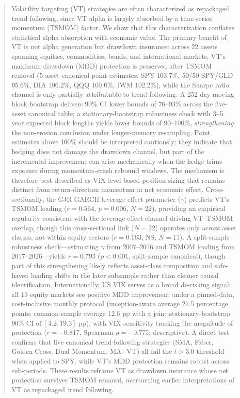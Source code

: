 
\begin{abstract}
\noindent
Volatility targeting (VT) strategies are often characterized as repackaged trend following, since VT alpha is largely absorbed by a time-series momentum (TSMOM) factor. We show that this characterization conflates statistical alpha absorption with economic value. The primary benefit of VT is not alpha generation but drawdown insurance: across 22 assets spanning equities, commodities, bonds, and international markets, VT's maximum drawdown (MDD) protection is preserved after TSMOM removal (5-asset canonical point estimates: SPY 103.7\%, 50/50 SPY/GLD 95.6\%, DIA 106.2\%, QQQ 109.0\%, IWM 102.2\%), while the Sharpe ratio channel is only partially attributable to trend following. A 252-day moving-block bootstrap delivers 90\% CI lower bounds of 76--93\% across the five-asset canonical table; a stationary-bootstrap robustness check with 3--5 year expected block lengths yields lower bounds of 90--100\%, \emph{strengthening} the non-erosion conclusion under longer-memory resampling. Point estimates above 100\% should be interpreted cautiously: they indicate that hedging does not damage the drawdown channel, but part of the incremental improvement can arise mechanically when the hedge trims exposure during momentum-crash rebound windows. The mechanism is therefore best described as VIX-level-based position sizing that remains distinct from return-direction momentum in net economic effect. Cross-sectionally, the GJR-GARCH leverage effect parameter ($\gamma$) predicts VT's TSMOM loading ($r = 0.564$, $p = 0.006$, $N = 22$), providing an empirical regularity consistent with the leverage effect channel driving VT--TSMOM overlap, though this cross-sectional link ($N = 22$) operates only across asset classes, not within equity sectors ($r = 0.163$, NS, $N = 11$). A split-sample robustness check---estimating $\gamma$ from 2007--2016 and TSMOM loading from 2017--2026---yields $r = 0.793$ ($p < 0.001$, split-sample canonical), though part of this strengthening likely reflects asset-class composition and safe-haven loading shifts in the later subsample rather than cleaner causal identification. Internationally, US VIX serves as a broad de-risking signal: all 13 equity markets see positive MDD improvement under a pinned-data, cost-inclusive monthly protocol (inception-aware average 27.5 percentage points; common-sample average 12.6 pp with a joint stationary-bootstrap 90\% CI of $[4.2, 19.3]$ pp), with VIX sensitivity tracking the magnitude of protection ($r = -0.817$, Spearman $\rho = -0.775$; descriptive). A direct test confirms that five canonical trend-following strategies (SMA, Faber, Golden Cross, Dual Momentum, MA+VT) all fail the \citet{harvey2016} $t > 3.0$ threshold when applied to SPY, while VT's MDD protection remains robust across sub-periods. These results reframe VT as drawdown insurance whose net protection survives TSMOM removal, overturning earlier interpretations of VT as repackaged trend following.


\end{abstract}
